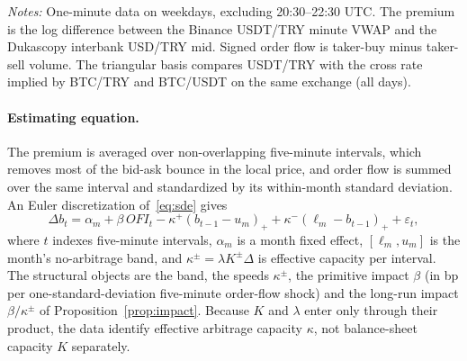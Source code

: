 \documentclass[12pt]{article}
\theoremstyle{definition}
\theoremstyle{remark}
\newcommand{\pos}[1]{\left(#1\right)_+}
\begin{document}
\begin{table}[t]
\centering
\caption{\textbf{Summary statistics: USDT/TRY, January 2024 -- August 2026}}
\label{tab:summary}
\footnotesize
\resizebox{\ifdim\width>\textwidth\textwidth\else\width\fi}{!}{}
\begin{minipage}{0.95\textwidth}
\footnotesize\vspace{4pt}
\emph{Notes:} One-minute data on weekdays, excluding 20:30--22:30 UTC. The premium is the log difference between the Binance USDT/TRY minute VWAP and the Dukascopy interbank USD/TRY mid. Signed order flow is taker-buy minus taker-sell volume. The triangular basis compares USDT/TRY with the cross rate implied by BTC/TRY and BTC/USDT on the same exchange (all days).
\end{minipage}
\end{table}

\paragraph{Estimating equation.} The premium is averaged over non-overlapping five-minute intervals, which removes most of the bid-ask bounce in the local price, and order flow is summed over the same interval and standardized by its within-month standard deviation. An Euler discretization of~\eqref{eq:sde} gives
\begin{equation}\label{eq:emp}
\Delta b_t=\alpha_m+\beta\,\mathit{OFI}_t-\kappa^+\pos{b_{t-1}-u_m}+\kappa^-\pos{\ell_m-b_{t-1}}+\varepsilon_t,
\end{equation}
where $t$ indexes five-minute intervals, $\alpha_m$ is a month fixed effect, $[\ell_m,u_m]$ is the month's no-arbitrage band, and $\kappa^\pm=\lambda K^\pm\Delta$ is effective capacity per interval. The structural objects are the band, the speeds $\kappa^\pm$, the primitive impact $\beta$ (in bp per one-standard-deviation five-minute order-flow shock) and the long-run impact $\beta/\kappa^\pm$ of Proposition~\ref{prop:impact}. Because $K$ and $\lambda$ enter only through their product, the data identify effective arbitrage capacity $\kappa$, not balance-sheet capacity $K$ separately.
\end{document}
